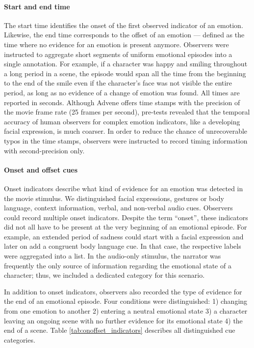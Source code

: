 \documentclass[10pt,a4paper,twocolumn]{article}
\begin{document}
\paragraph{Start and end time}

The start time identifies the onset of the first observed indicator of an
emotion. Likewise, the end time corresponds to the offset of an emotion ---
defined as the time where no evidence for an emotion is present anymore.
Observers were instructed to aggregate short segments of uniform emotional
episodes into a single annotation. For example, if a character was happy and
smiling throughout a long period in a scene, the episode would span all the
time from the beginning to the end of the smile even if the character's face
was not visible the entire period, as long as no evidence of a change of
emotion was found. All times are reported in seconds. Although Advene offers
time stamps with the precision of the movie frame rate (25 frames per second),
pre-tests revealed that the temporal accuracy of human observers for complex
emotion indicators, like a developing facial expression, is much coarser. In
order to reduce the chance of unrecoverable typos in the time stamps, observers
were instructed to record timing information with second-precision only.

\paragraph{Onset and offset cues}

Onset indicators describe what kind of evidence for an emotion was detected in
the movie stimulus. We distinguished facial expressions, gestures or body
language, context information, verbal, and non-verbal audio cues. Observers
could record multiple onset indicators. Despite the term ``onset'', these
indicators did not all have to be present at the very beginning of an emotional
episode. For example, an extended period of sadness could start with a facial
expression and later on add a congruent body language cue. In that case, the
respective labels were aggregated into a list. In the audio-only stimulus, the
narrator was frequently the only source of information regarding the emotional
state of a character; thus, we included a dedicated category for this scenario.

In addition to onset indicators, observers also recorded the type of evidence
for the end of an emotional episode. Four conditions were distinguished: 1)
changing from one emotion to another 2) entering a neutral emotional state 3) a
character leaving an ongoing scene with no further evidence for its emotional
state 4) the end of a scene. Table \ref{tab:onoffset_indicators}
describes all distinguished cue categories.
\end{document}
